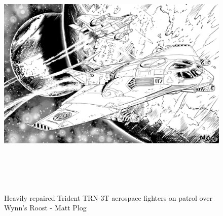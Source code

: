 \begin{figure}[!h]
  \centering
{}
{
}
{
  \includegraphics[alt="Trident TRN-3T aerospace fighters on patrol over Wynn's Roost", width=7.0in, height=4.5in]{img/Flyby.png}
}
  \caption*{Heavily repaired Trident TRN-3T aerospace fighters on patrol over Wynn's Roost - Matt Plog}
\end{figure}
